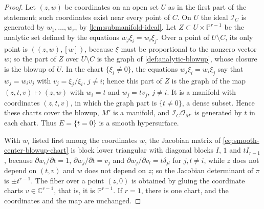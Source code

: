 \begin{proof}
Let $(z,w)$ be coordinates on an open set $U$ as in the first part of the statement; such coordinates exist near every point of $C$. On $U$ the ideal $\mathcal I_C$ is generated by $w_1,\ldots,w_r$, by \cref{lem:submanifold-ideal}. Let $Z\subset U\times\mathbb P^{r-1}$ be the analytic set defined by the equations $w_j\xi_i=w_i\xi_j$. Over a point of $U\setminus C$, its only point is $((z,w),[w])$, because $\xi$ must be proportional to the nonzero vector $w$; so the part of $Z$ over $U\setminus C$ is the graph of \cref{def:analytic-blowup}, whose closure is the blowup of $U$. In the chart $\{\xi_i\neq0\}$, the equations $w_j\xi_i=w_i\xi_j$ say that $w_j=w_iv_j$ with $v_j=\xi_j/\xi_i$, $j\neq i$; hence this part of $Z$ is the graph of the map $(z,t,v)\mapsto(z,w)$ with $w_i=t$ and $w_j=tv_j$, $j\neq i$. It is a manifold with coordinates $(z,t,v)$, in which the graph part is $\{t\neq0\}$, a dense subset. Hence these charts cover the blowup, $M'$ is a manifold, and $\mathcal I_C\mathcal O_{M'}$ is generated by $t$ in each chart. Thus $E=\{t=0\}$ is a smooth hypersurface.

With $w_i$ listed first among the coordinates $w$, the Jacobian matrix of \eqref{eq:smooth-center-blowup-chart} is block lower triangular with diagonal blocks $I$, $1$ and $tI_{r-1}$, because $\partial w_i/\partial t=1$, $\partial w_j/\partial t=v_j$ and $\partial w_j/\partial v_l=t\delta_{jl}$ for $j,l\neq i$, while $z$ does not depend on $(t,v)$ and $w$ does not depend on $z$; so the Jacobian determinant of $\pi$ is $\pm t^{r-1}$. The fiber over a point $(z,0)$ is obtained by gluing the coordinate charts $v\in\mathbb C^{r-1}$, that is, it is $\mathbb P^{r-1}$. If $r=1$, there is one chart, and the coordinates and the map are unchanged.


\end{proof}

